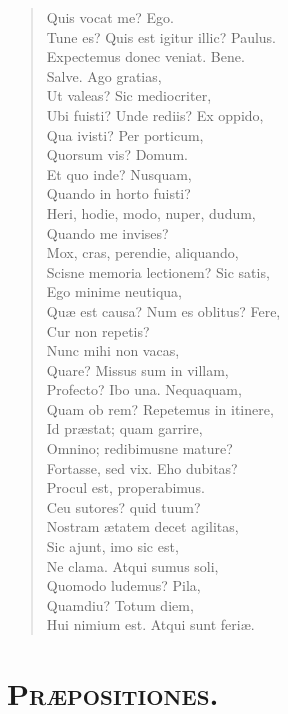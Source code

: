 \begin{verse}

  Quis vocat me? Ego.\\
  Tune es? Quis est igitur illic? Paulus.\\
  Expectemus donec veniat. Bene.\\
  Salve. Ago gratias,\\
  Ut valeas? Sic mediocriter,\\
  Ubi fuisti? Unde rediis? Ex oppido,\\
  Qua ivisti? Per porticum,\\
  Quorsum vis? Domum.\\
  Et quo inde? Nusquam,\\
  Quando in horto fuisti?\\
  Heri, hodie, modo, nuper, dudum,\\
  Quando me invises?\\
  Mox, cras, perendie, aliquando,\\
  Scisne memoria lectionem? Sic satis,\\
  Ego minime neutiqua,\\
  Quæ est causa? Num es oblitus? Fere,\\
  Cur non repetis?\\
  Nunc mihi non vacas,\\
  Quare? Missus sum in villam,\\
  Profecto? Ibo una. Nequaquam,\\
  Quam ob rem? Repetemus in itinere,\\
  Id præstat; quam garrire,\\
  Omnino; redibimusne mature?\\
  Fortasse, sed vix. Eho dubitas?\\
  Procul est, properabimus.\\
  Ceu sutores? quid tuum?\\
  Nostram ætatem decet agilitas,\\
  Sic ajunt, imo sic est,\\
  Ne clama. Atqui sumus soli,\\
  Quomodo ludemus? Pila,\\
  Quamdiu? Totum diem,\\
  Hui nimium est. Atqui sunt feriæ.\\
\end{verse}



\section*{\textsc{Præpositiones.}}


